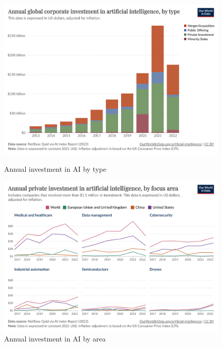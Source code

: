 \documentclass[paper=a4, fontsize=11pt]{scrartcl} %
\numberwithin{equation}{section} %
\numberwithin{figure}{section} %
\numberwithin{table}{section} %
\begin{document}
\begin{figure}[H]
    \centering
    \begin{minipage}[t]{0.48\linewidth}
        \includegraphics[width=\linewidth]{./data/investment_by_type.png}
        \caption{Annual investment in AI by type}
        \label{fig:investment}
    \end{minipage}\hfill
    \begin{minipage}[t]{0.48\linewidth}
        \includegraphics[width=\linewidth]{./data/investment_by_area.png}
        \caption{Annual investment in AI by area}
        \label{fig:views_ai_impact}
    \end{minipage}
\end{figure}


\end{document}
